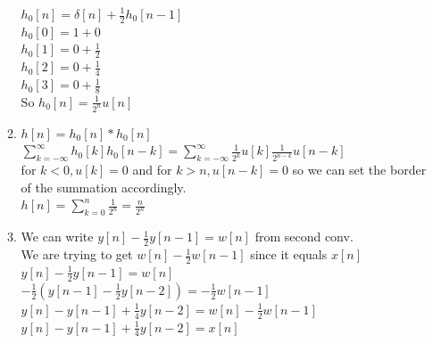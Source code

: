 \documentclass[10pt,a4paper, margin=1in]{article}
\begin{document}
\begin{enumerate}
\begin{enumerate}
    $h_0[n] = \delta[n] + \frac{1}{2}h_0[n-1]$ \\

    $h_0[0] = 1 + 0$ \\

    $h_0[1] = 0 + \frac{1}{2}$ \\ 

    $h_0[2] = 0 + \frac{1}{4}$ \\ 

    $h_0[3] = 0 + \frac{1}{8}$ \\

    So $h_0[n] = \frac{1}{2^n}u[n]$
    \item %
    $h[n] = h_0[n] * h_0[n]$ \\

    $\sum_{k=-\infty}^{\infty}h_0[k]h_0[n-k] = \sum_{k=-\infty}^{\infty}\frac{1}{2^k}u[k]\frac{1}{2^{n-k}}u[n-k]$ \\

    for $k < 0, u[k] = 0$ and for $ k > n, u[n-k] = 0$ so we can set the border of the summation accordingly.\\

    $h[n] = \sum_{k=0}^{n}\frac{1}{2^n} = \frac{n}{2^n}$\\

	\item %
	We can write $y[n] - \frac{1}{2}y[n-1]=w[n]$ from second conv.\\

    We are trying to get $w[n] - \frac{1}{2}w[n-1]$ since it equals $x[n]$\\

    $y[n] - \frac{1}{2}y[n-1]=w[n]$ \\

    $-\frac{1}{2}(y[n-1] - \frac{1}{2}y[n-2])=-\frac{1}{2}w[n-1]$ \\

    $y[n] - y[n-1] +\frac{1}{4} y[n-2] = w[n] - \frac{1}{2}w[n-1]$ \\

    $y[n] - y[n-1] +\frac{1}{4} y[n-2] = x[n]$ \\
    \end{enumerate}
    

\end{enumerate}
\end{document}
